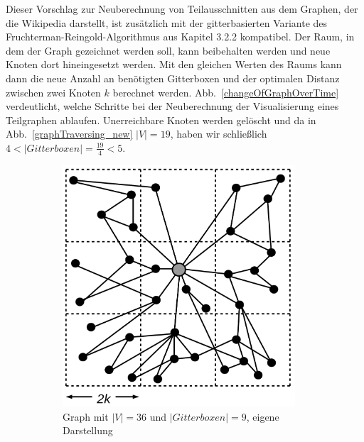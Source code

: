 \documentclass[12pt, a4paper]{article}
\begin{document}
Dieser Vorschlag zur Neuberechnung von Teilausschnitten aus dem Graphen, der die Wikipedia darstellt, ist zusätzlich mit der gitterbasierten Variante des Fruchterman-Reingold-Algorithmus aus Kapitel 3.2.2 kompatibel. Der Raum, in dem der Graph gezeichnet werden soll, kann beibehalten werden und neue Knoten dort hineingesetzt werden. Mit den gleichen Werten des Raums kann dann die neue Anzahl an benötigten Gitterboxen und der optimalen Distanz zwischen zwei Knoten $k$ berechnet werden. Abb.~\ref{changeOfGraphOverTime} verdeutlicht, welche Schritte bei der Neuberechnung der Visualisierung eines Teilgraphen ablaufen. Unerreichbare Knoten werden gelöscht und da in Abb.~\ref{graphTraversing_new} $|V|=19$, haben wir schließlich $4 < |Gitterboxen| = \frac{19}{4} < 5$.\\

\begin{figure}
\centering
\begin{subfigure}[t]{0.45\textwidth}
\centering
\includegraphics[width=0.95\textwidth]{graphTraversing_orig.png}
\caption[Graph mit $|V|=36$ und $|Gitterboxen|=9$]{Graph mit $|V|=36$ und $|Gitterboxen|=9$, eigene Darstellung}
\label{graphTraversing_orig}
\end{subfigure}
\hfill
\begin{subfigure}[t]{0.45\textwidth}
\centering

\end{subfigure}
\end{figure}
\end{document}
